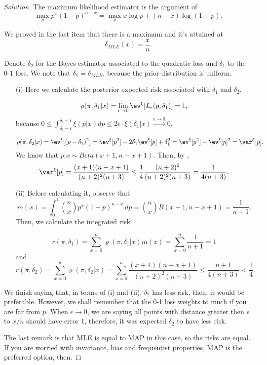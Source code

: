 \begin{proof}[Solution]
    The maximum likelihood estimator is the argument of 
    $$\max_p p^x(1-p)^{n-x} = \max_p x\log p + (n-x)\log (1-p).$$

    We proved in the last item that there is a maximum and it's attained
    at 
    $$
    \delta_{MLE}(x) = \frac{x}{n}.
    $$

    Denote $\delta_2$ for the Bayes estimator associated to the quadratic
    loss and $\delta_1$ to the 0-1 loss. We note that $\delta_1 =
    \delta_{MLE}$, because the prior distribution is uniform. 
    
    \begin{enumerate}
        \item[(i)] Here we calculate the posterior expected risk associated
        with $\delta_1$ and $\delta_2$.  

        $$\varrho(\pi, \delta_1|x) = \lim_{\epsilon \to
        0}\ev^{\xi}[L_{\epsilon}(p, \delta_1)] = 1,$$
        because $0 \le \int_{\delta_1-\epsilon}^{\delta_1+\epsilon}
        \xi(p|x)dp \le 2\epsilon\cdot\xi(\delta_1|x) \overset{\epsilon\to
        0}{\to} 0$.

        $$
        \varrho(\pi, \delta_2|x) = \ev^{\xi}[(p - \delta_1)^2] = \ev^{\xi}[p^2] - 2\delta_1\ev^{\xi}[p] + \delta_1^2 = \ev^{\xi}[p^2] -\ev^{\xi}[p]^2 = \var^{\xi}[p].
        $$
        We know that $p|x \sim Beta(x+1, n-x+1)$. Then, by \cite{beta-dist},
        $$\var^{\xi}[p] = \frac{(x+1)(n-x+1)}{(n+2)^2(n+3)} \le
        \frac{1}{4}\frac{(n+2)^2}{(n+2)^2(n+3)} = \frac{1}{4(n+3)}.$$

        \item[(ii)] Before calculating it, observe that 
        $$
        m(x) = \int_0^1 \binom{n}{x}p^x(1-p)^{n-x} \, dp = \binom{n}{x}B(x+1,n-x+1) = \frac{1}{n+1}.
        $$
        Then, we calculate the integrated risk 
        
        $$
        r(\pi, \delta_1) = \sum_{x=0}^n \varrho(\pi, \delta_1|x)m(x)= \sum_{x=0}^n \frac{1}{n+1} = 1
        $$
        and
        $$
        r(\pi, \delta_2) = \sum_{x=0}^n \varrho(\pi, \delta_2|x)= \sum_{x=0}^n \frac{(x+1)(n-x+1)}{(n+2)^2(n+3)} \le \frac{n+1}{4(n+3)} < \frac{1}{4}.
        $$
    \end{enumerate}
    We finish saying that, in terms of (i) and (ii), $\delta_2$ has less risk, then,
    it would be preferable. However, we shall remember that the 0-1 loss weights to
    much if you are far from $p$. When $\epsilon \to 0$, we are saying all
    points with distance greater then $\epsilon$ to $x/n$ should have error 1,
    therefore, it was expected $\delta_2$ to have less risk. 

    The last remark is that MLE is equal to MAP in this case, so the risks
    are equal. If you are worried with invariance, bias and frequentist
    properties, MAP is the preferred option, then. 
\end{proof}